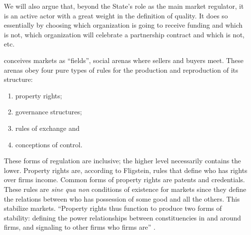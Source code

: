 \documentclass[a4paper, 12pt, openright, oneside, german, french, brazil, english, article]{abntex2}
\begin{document}
        We will also argue that, beyond the State's role as the main market regulator, it is an active actor with a great weight in the definition of quality. It does so essentially by choosing which organization is going to receive funding and which is not, which organization will celebrate a partnership contract and which is not, etc.
	
	
	 conceives markets as ``fields'', social arenas where sellers and buyers meet. These arenas obey four pure types of rules for the production and reproduction of its structure:
	
	\begin{enumerate}
		\item property rights;
		\item governance structures;
		\item rules of exchange and
		\item conceptions of control.
	\end{enumerate}
	
	
		
	
	These forms of regulation are inclusive; the higher level necessarily contains the lower. Property rights are, according to Fligstein, rules that define who has rights over firms income. Common forms of property rights are patents and credentials. These rules are \textit{sine qua non} conditions of existence for markets since they define the relations between who has possession of some good and all the others. This stabilize markets. ``Property rights thus function to produce two forms of stability: defining the power relationships between constituencies in and around firms, and signaling to other firms who firms are'' \cite[p. 34]{fligstein2002architecture}.
	
\end{document}

